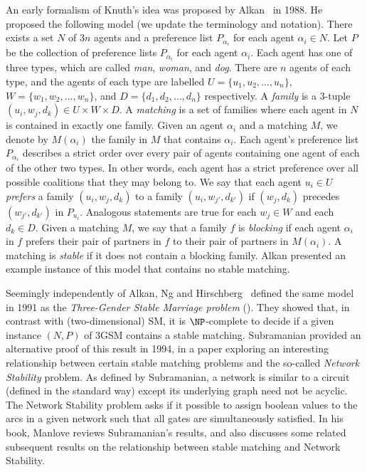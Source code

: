 An early formalism of Knuth's idea was proposed by Alkan~\cite{Alk88} in 1988. He proposed the following model (we update the terminology and notation). There exists a set $N$ of $3n$ agents and a preference list $P_{\alpha_i}$ for each agent $\alpha_i \in N$. Let $P$ be the collection of preference lists $P_{\alpha_i}$ for each agent $\alpha_i$. Each agent has one of three types, which are called \emph{man}, \emph{woman}, and \emph{dog}. There are $n$ agents of each type, and the agents of each type are labelled $U = \{ u_1, u_2, \dots, u_n \}$, $W = \{ w_1, w_2, \dots, w_n \}$, and $D =  \{ d_1, d_2, \dots, d_n \}$ respectively. A \textit{family} is a $3$-tuple $( u_i, w_j, d_k ) \in U\times W\times D$.  A \textit{matching} is a set of families where each agent in $N$ is contained in exactly one family. Given an agent $\alpha_i$ and a matching $M$, we denote by $M(\alpha_i)$ the family in $M$ that contains $\alpha_i$. Each agent's preference list $P_{\alpha_i}$ describes a strict order over every pair of agents containing one agent of each of the other two types. In other words, each agent has a strict preference over all possible coalitions that they may belong to. We say that each agent $u_i \in U$ \textit{prefers} a family $( u_i, w_j, d_k )$ to a family $( u_i, w_{j'}, d_{k'} )$ if $( w_j, d_k )$ precedes $( w_{j'}, d_{k'} )$ in $P_{u_i}$. Analogous statements are true for each $w_j \in W$ and each $d_k \in D$. Given a matching $M$, we say that a family $f$ is \textit{blocking} if each agent $\alpha_i$ in $f$ prefers their pair of partners in $f$ to their pair of partners in $M(\alpha_i)$. A matching is \textit{stable} if it does not contain a blocking family. Alkan presented an example instance of this model that contains no stable matching.

Seemingly independently of Alkan, Ng and Hirschberg~\cite{NH91} defined the same model in 1991 as the \emph{Three-Gender Stable Marriage problem} (). They showed that, in contrast with (two-dimensional) SM, it is $\NP$-complete to decide if a given instance $(N, P)$ of 3GSM contains a stable matching. Subramanian \cite{Sub94} provided an alternative proof of this result in 1994, in a paper exploring an interesting relationship between certain stable matching problems and the so-called \emph{Network Stability} problem. As defined by Subramanian, a network is similar to a circuit (defined in the standard way) except its underlying graph need not be acyclic. The Network Stability problem asks if it possible to assign boolean values to the arcs in a given network such that all gates are simultaneously satisfied. In his book, Manlove \cite{AMUP} reviews Subramanian's results, and also discusses some related subsequent results on the relationship between stable matching and Network Stability.

